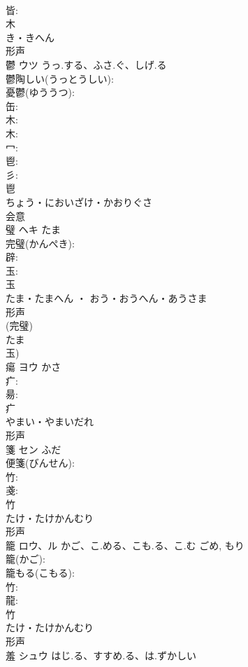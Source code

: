 \documentclass[8pt]{extreport}
\begin{document}
\begin{CJK}{UTF8}{min}
\\	皆: 
\\	木	
\\	き・きへん	
\\	形声 
\\	鬱	ウツ	うっ.する、ふさ.ぐ、しげ.る		
\\	鬱陶しい(うっとうしい): 
\\	憂鬱(ゆううつ): 
\\	缶: 
\\	木: 
\\	木: 
\\	冖: 
\\	鬯: 
\\	彡: 
\\	鬯	
\\	ちょう・においざけ・かおりぐさ	
\\	会意 
\\	璧	ヘキ	たま		
\\	完璧(かんぺき): 
\\	辟: 
\\	玉: 
\\	玉	
\\	たま・たまへん ・ おう・おうへん・あうさま	
\\	形声 
\\	(完璧) 
\\	たま 
\\	玉) 
\\	瘍	ヨウ	かさ		
\\	疒: 
\\	昜: 
\\	疒	
\\	やまい・やまいだれ	
\\	形声 
\\	箋	セン	ふだ		
\\	便箋(びんせん): 
\\	竹: 
\\	戔: 
\\	竹	
\\	たけ・たけかんむり	
\\	形声 
\\	籠	ロウ、ル	かご、こ.める、こも.る、こ.む	ごめ, もり	
\\	籠(かご): 
\\	籠もる(こもる): 
\\	竹: 
\\	龍: 
\\	竹	
\\	たけ・たけかんむり	
\\	形声 
\\	羞	シュウ	はじ.る、すすめ.る、は.ずかしい		

\end{CJK}
\end{document}
